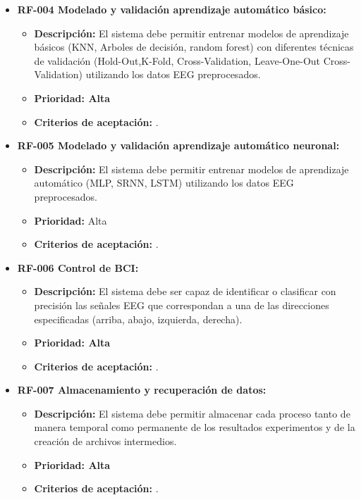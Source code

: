 \begin{itemize}
\item
  \textbf{RF-004 Modelado y validación aprendizaje automático básico:}

  \begin{itemize}
  \tightlist
  \item
   \textbf{Descripción:} El sistema debe permitir entrenar modelos de aprendizaje básicos (KNN, Arboles de decisión, random forest) con diferentes técnicas de validación (Hold-Out,K-Fold, Cross-Validation, Leave-One-Out Cross-Validation) utilizando los datos EEG preprocesados.
  \item  
   \textbf{Prioridad: Alta}
  \item  
   \textbf{Criterios de aceptación:} .
	\textbf{}
  \end{itemize}


\item
  \textbf{RF-005 Modelado y validación aprendizaje automático neuronal:}
  
  \begin{itemize}
  \tightlist
  \item
   \textbf{Descripción:} El sistema debe permitir entrenar modelos de aprendizaje automático (MLP, SRNN, LSTM) utilizando los datos EEG preprocesados.
  \item  
   \textbf{Prioridad:} Alta
  \item  
   \textbf{Criterios de aceptación:} .
  \end{itemize}


\item
  \textbf{RF-006 Control de BCI:}

  \begin{itemize}
  \tightlist
  \item
   \textbf{Descripción:} El sistema debe ser capaz de identificar o clasificar con precisión las señales EEG que correspondan a una de las direcciones especificadas (arriba, abajo, izquierda, derecha).
  \item  
   \textbf{Prioridad: Alta}
  \item  
   \textbf{Criterios de aceptación:} .
  \end{itemize}


\item
  \textbf{RF-007 Almacenamiento y recuperación de datos:}

  \begin{itemize}
  \tightlist
  \item
   \textbf{Descripción:} El sistema debe permitir almacenar cada proceso tanto de manera temporal como permanente de los resultados experimentos y de la creación de archivos intermedios.
  \item  
   \textbf{Prioridad: Alta}
  \item  
   \textbf{Criterios de aceptación:} .
  \end{itemize}


\end{itemize}
